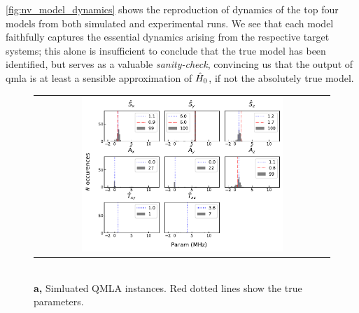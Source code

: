 \cref{fig:nv_model_dynamics} shows the reproduction of dynamics of the top four models
    from both simulated and experimental \glspl{run}. 
We see that each model faithfully captures the essential dynamics arising from the respective target systems;
    this alone is insufficient to conclude that the true model has been identified, 
    but serves as a valuable \emph{sanity-check}, convincing us that the output of \gls{qmla} is at least a sensible 
    approximation of $\hat{H}_0$, if not the absolutely true model.
\par 


\begin{figure}
    \centering
    \begin{tabular}{@{}c@{}}
        \centering
        \includegraphics[width=0.7\textwidth]{experimental_study/figures/params_simulation.pdf}
    \end{tabular}
    \\ \small \textbf{a,} Simluated QMLA instances. Red dotted lines show the true parameters.
    

\end{figure}

